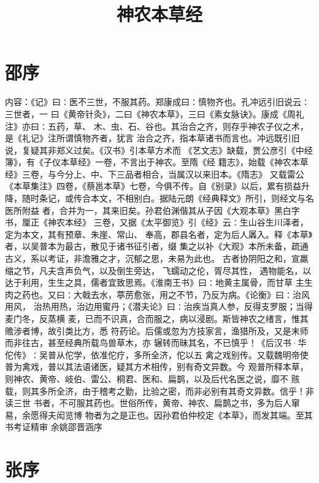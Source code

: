 \documentclass[12pt,UTF8]{ctexbook}
\title{\heiti\zihao{0} 神农本草经}
\author{}
\date{}
\begin{document}
	
\maketitle
\tableofcontents
	
\frontmatter

\chapter{邵序}

内容：《记》曰∶医不三世，不服其药。郑康成曰∶慎物齐也。孔冲远引旧说云∶三世者，一 
曰《黄帝针灸》，二曰《神农本草》，三曰《素女脉诀》。康成《周礼注》亦曰∶五药，草、 
木、虫、石、谷也。其治合之齐，则存乎神农子仪之术，是《礼记》注所谓慎物齐者，犹言 
治合之齐，指本草诸书而言也。冲远既引旧说，复疑其非郑义过矣。《汉书》引本草方术而 
《艺文志》缺载，贾公彦引《中经簿》，有《子仪本草经》一卷，不言出于神农。至隋《经 
籍志》，始载《神农本草经》三卷，与今分上、中、下三品者相合，当属汉以来旧本。《隋志》 
又载雷公《本草集注》四卷，《蔡邕本草》七卷，今俱不传。自《别录》以后，累有损益升 
降，随时条记，或传合本文，不相别白。据陆元朗《经典释文》所引，则经文与名医所附益 
者，合并为一，其来旧矣。孙君伯渊偕其从子因《大观本草》黑白字书，厘正《神农本经》 
三卷，又据《太平御览》引《经》云∶生山谷生川泽者，定为本文，其有预章、朱崖、常山、 
奉高，郡县名者，定为后人羼入。释《本草》者，以吴普本为最古，散见于诸书征引者，缀 
集之以补《大观》本所未备，疏通古义，系以考证，非澹雅之才，沉郁之思，未易为此也。 
古者协阴阳之和，宣羸缩之节，凡夫含声负气，以及倒生旁达， 飞蠕动之伦，胥尽其性， 
遇物能名，以达于利用，生生之具，儒者宜致思焉。《淮南王书》曰∶地黄主属骨，而甘草 
主生肉之药也。又曰∶大戟去水，葶苈愈张，用之不节，乃反为病。《论衡》曰∶治风用风， 
治热用热，治边用蜜丹；《潜夫论》曰∶治疾当真人参，反得支罗服；当得麦门冬，反蒸横 
麦，已而不识真，合而服之，病以浸剧。斯皆神农之绪言，惟其赡涉者博，故引类比方，悉 
符药论。后儒或忽为方技家言，渔猎所及，又是末师而非往古，甚至经典所载鸟兽草木，亦 
辗转而昧其名，不已慎乎！《后汉书·华佗传》∶吴普从佗学，依准佗疗，多所全济，佗以五 
禽之戏别传。又载魏明帝使普为禽戏，普以其法语诸医，疑其方术相传，别有奇文异数。今 
观普所释本草，则神农、黄帝、岐伯、雷公、桐君、医和、扁鹊，以及后代名医之说，靡不 
赅载，则其多所全济，由于稽考之勤，比验之密，而非必别有其奇文异数。信乎！非读三世 
书者，不可服其药也。世俗所传，黄帝、神农、扁鹊之书，多为后人窜易，余愿得夫闳览博 
物者为之是正也。因孙君伯仲校定《本草》，而发其端。至其书考证精审 
余姚邵晋涵序

\chapter{张序}
\end{document}
